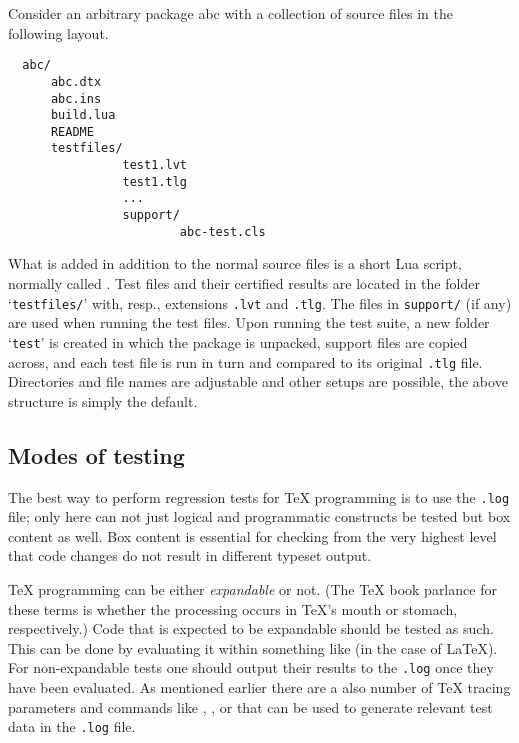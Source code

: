 \documentclass[a4paper]{ltugboat}
\begin{document}
Consider an arbitrary package \textsf{abc} with a collection of source
files in the following layout.
\begin{Verbatim}
  abc/
      abc.dtx
      abc.ins
      build.lua
      README
      testfiles/
                test1.lvt
                test1.tlg
                ...
                support/
                        abc-test.cls
\end{Verbatim}
What is added in addition to the normal source files is a short Lua
script, normally called \texttt{\drivername}.  Test files and their
certified results are located in the folder `\texttt{testfiles/}'
with, resp., extensions \texttt{.lvt} and \texttt{.tlg}.  The files in
\texttt{support/} (if any) are used when running the test files.  Upon
running the test suite, a new folder `\texttt{test}' is created in
which the package is unpacked, support files are copied across, and
each test file is run in turn and compared to its original
\texttt{.tlg} file. Directories and file names are adjustable and
other setups are possible, the above structure is simply the default.


\subsection{Modes of testing}

The best way to perform regression tests for \TeX{} programming is to
use the \texttt{.log} file; only here can not just logical and
programmatic constructs be tested but box content as well.  Box
content is essential for checking from the very highest level that
code changes do not result in different typeset output.

\TeX{} programming can be either \emph{expandable} or not.  (The \TeX
book parlance for these terms is whether the processing occurs in
\TeX's mouth or stomach, respectively.)  Code that is expected to be
expandable should be tested as such.  This can be done by evaluating it within something like  (in the case of \LaTeX). For non-expandable tests one should output
their results to the \texttt{.log} once they have been evaluated.
%
As mentioned earlier there are a also number of \TeX{} tracing parameters
and commands like , , or  that
can be used to generate relevant test data in the \texttt{.log} file.
\end{document}

